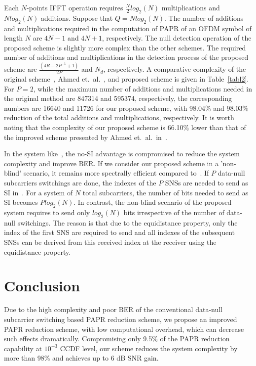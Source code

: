\documentclass[journal,comsoc]{IEEEtran}
\begin{document}
    Each $N$-points IFFT operation requires $\frac{N}{2}log_2(N)$ multiplications and $Nlog_2(N)$ additions. Suppose that $Q=Nlog_2(N)$. The number of additions and multiplications required in the computation of PAPR of an OFDM symbol of length $N$ are $4N-1$ and $4N+1$, respectively. The null detection operation of the proposed scheme is slightly more complex than the other schemes. The required number of additions and multiplications in the detection process of the proposed scheme are $\frac{(4R-2P^{-1}+1)}{2P}$ and $N_d$, respectively.  A comparative complexity of the original scheme~\cite{wong1}, Ahmed et.~al.~\cite{sabbir2}, and proposed scheme is given in Table~\ref{tabl2}. For $P=2$, while the maximum number of additions and multiplications needed in the original method are 847314 and 595374, respectively, the corresponding numbers are 16640 and 11726 for our proposed scheme, with 98.04\% and 98.03\% reduction of the total additions and multiplications, respectively. It is worth noting that the complexity of our proposed scheme is 66.10\% lower than that of the improved scheme presented by Ahmed et.~al.~in~\cite{sabbir2}.
    
    In the system like~\cite{wong2}, the no-SI advantage is compromised to reduce the system complexity and improve BER. If we consider our proposed scheme in a 'non-blind' scenario, it remains more spectrally efficient compared to~\cite{wong2}. If $P$ data-null subcarriers switchings are done, the indexes of the $P$ SNSs are needed to send as SI in~\cite{wong2}. For a system of $N$ total subcarriers, the number of bits needed to send as SI becomes $Plog_2(N)$. In contrast, the non-blind scenario of the proposed system requires to send only $log_2(N)$ bits irrespective of the number of data-null switchings. The reason is that due to the equidistance property, only the index of the first SNS are required to send and all indexes of the subsequent SNSs can be derived from this received index at the receiver using the equidistance property.

\section{Conclusion}
 Due to the high complexity and poor BER of the conventional data-null subcarrier switching based PAPR reduction scheme, we propose an improved PAPR reduction scheme, with low computational overhead, which can decrease such effects dramatically. Compromising only 9.5\% of the PAPR reduction capability at $10^{-3}$ CCDF level, our scheme reduces the system complexity by more than 98\% and achieves up to 6 dB SNR gain.
\end{document}
